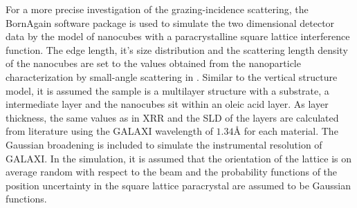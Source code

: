 \documentclass[\main/dresen_thesis.tex]{subfiles}
\begin{document}
      For a more precise investigation of the grazing-incidence scattering, the BornAgain software package \cite{Burle_2018_borna} is used to simulate the two dimensional detector data by the model of nanocubes with a paracrystalline square lattice interference function.
      The edge length, it's size distribution and the scattering length density of the nanocubes are set to the values obtained from the nanoparticle characterization by small-angle scattering in .
      Similar to the vertical structure model, it is assumed the sample is a multilayer structure with a  substrate, a  intermediate layer and the nanocubes sit within an oleic acid layer.
      As layer thickness, the same values as in XRR and the SLD of the layers are calculated from literature using the GALAXI wavelength of $1.34 \unit{\angstrom}$ for each material.
      The Gaussian broadening is included to simulate the instrumental resolution of GALAXI.
      In the simulation, it is assumed that the orientation of the lattice is on average random with respect to the beam and the probability functions of the position uncertainty in the square lattice paracrystal are assumed to be Gaussian functions.
\end{document}
